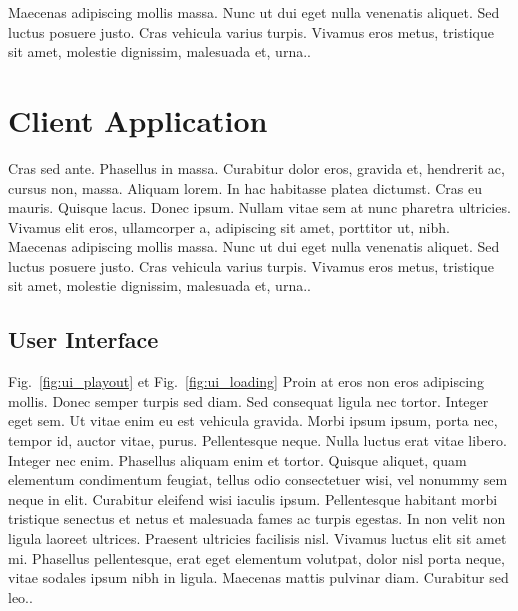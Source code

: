 Maecenas adipiscing mollis massa. Nunc ut dui eget nulla venenatis aliquet. Sed luctus posuere justo. Cras vehicula varius turpis. Vivamus eros metus, tristique sit amet, molestie dignissim, malesuada et, urna..
\section{Client Application}
Cras sed ante. Phasellus in massa. Curabitur dolor eros, gravida et, hendrerit ac, cursus non, massa. Aliquam lorem. In hac habitasse platea dictumst. Cras eu mauris. Quisque lacus. Donec ipsum. Nullam vitae sem at nunc pharetra ultricies. Vivamus elit eros, ullamcorper a, adipiscing sit amet, porttitor ut, nibh. Maecenas adipiscing mollis massa. Nunc ut dui eget nulla venenatis aliquet. Sed luctus posuere justo. Cras vehicula varius turpis. Vivamus eros metus, tristique sit amet, molestie dignissim, malesuada et, urna..
\subsection{User Interface}
Fig.~\ref{fig:ui_playout} et Fig.~\ref{fig:ui_loading} Proin at eros non eros adipiscing mollis. Donec semper turpis sed diam. Sed consequat ligula nec tortor. Integer eget sem. Ut vitae enim eu est vehicula gravida. Morbi ipsum ipsum, porta nec, tempor id, auctor vitae, purus. Pellentesque neque. Nulla luctus erat vitae libero. Integer nec enim. Phasellus aliquam enim et tortor. Quisque aliquet, quam elementum condimentum feugiat, tellus odio consectetuer wisi, vel nonummy sem neque in elit. Curabitur eleifend wisi iaculis ipsum. Pellentesque habitant morbi tristique senectus et netus et malesuada fames ac turpis egestas. In non velit non ligula laoreet ultrices. Praesent ultricies facilisis nisl. Vivamus luctus elit sit amet mi. Phasellus pellentesque, erat eget elementum volutpat, dolor nisl porta neque, vitae sodales ipsum nibh in ligula. Maecenas mattis pulvinar diam. Curabitur sed leo..

